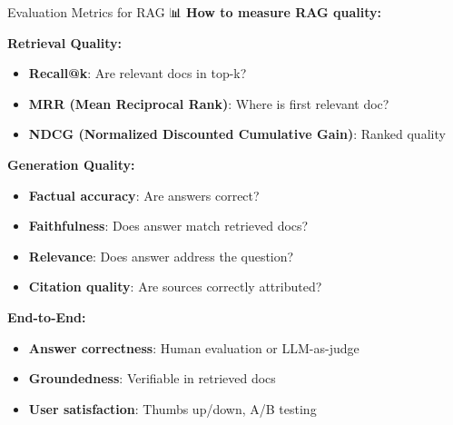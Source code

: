 \documentclass[aspectratio=169]{beamer}
\begin{document}
\begin{frame}[shrink=10]{Evaluation Metrics for RAG 📊}
\textbf{How to measure RAG quality:}

\vspace{0.5em}

\textbf{Retrieval Quality:}
\begin{itemize}\setlength{\itemsep}{0pt}
    \item \textbf{Recall@k}: Are relevant docs in top-k?
    \item \textbf{MRR (Mean Reciprocal Rank)}: Where is first relevant doc?
    \item \textbf{NDCG (Normalized Discounted Cumulative Gain)}: Ranked quality
\end{itemize}

\vspace{0.5em}

\textbf{Generation Quality:}
\begin{itemize}\setlength{\itemsep}{0pt}
    \item \textbf{Factual accuracy}: Are answers correct?
    \item \textbf{Faithfulness}: Does answer match retrieved docs?
    \item \textbf{Relevance}: Does answer address the question?
    \item \textbf{Citation quality}: Are sources correctly attributed?
\end{itemize}

\vspace{0.5em}

\textbf{End-to-End:}
\begin{itemize}\setlength{\itemsep}{0pt}
    \item \textbf{Answer correctness}: Human evaluation or LLM-as-judge
    \item \textbf{Groundedness}: Verifiable in retrieved docs
    \item \textbf{User satisfaction}: Thumbs up/down, A/B testing
\end{itemize}
\end{frame}
\end{document}
